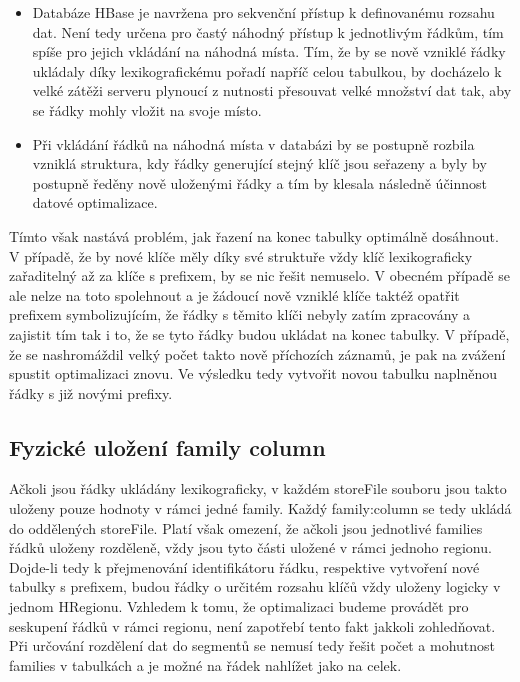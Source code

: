 \documentclass[thesis=M,czech]{FITthesis}[2012/06/26]
\begin{document}
\begin{itemize}
\item Databáze HBase je navržena pro sekvenční přístup k definovanému rozsahu dat. Není tedy určena pro častý náhodný přístup k jednotlivým řádkům, tím spíše pro jejich vkládání na náhodná místa. Tím, že by se nově vzniklé řádky ukládaly díky lexikografickému pořadí napříč celou tabulkou, by docházelo k velké zátěži serveru plynoucí z nutnosti přesouvat velké množství dat tak, aby se řádky mohly vložit na svoje místo.
 
\item Při vkládání řádků na náhodná místa v databázi by se postupně rozbila vzniklá struktura, kdy řádky generující stejný klíč jsou seřazeny a byly by postupně ředěny nově uloženými řádky a tím by klesala následně účinnost datové optimalizace. 
\end{itemize}

Tímto však nastává problém, jak řazení na konec tabulky optimálně dosáhnout. V případě, že by nové klíče měly díky své struktuře vždy klíč lexikograficky zařaditelný až za klíče s prefixem, by se nic řešit nemuselo. V obecném případě se ale nelze na toto spolehnout a je žádoucí nově vzniklé klíče taktéž opatřit prefixem symbolizujícím, že řádky s těmito klíči nebyly zatím zpracovány a zajistit tím tak i to, že se tyto řádky budou ukládat na konec tabulky. V případě, že se nashromáždil velký počet takto nově příchozích záznamů, je pak na zvážení spustit optimalizaci znovu. Ve výsledku tedy vytvořit novou tabulku naplněnou řádky s již novými prefixy. 

\subsection{Fyzické uložení family column}
Ačkoli jsou řádky ukládány lexikograficky, v každém storeFile souboru jsou takto uloženy pouze hodnoty v rámci jedné family. Každý family:column se tedy ukládá do oddělených storeFile. Platí však omezení, že ačkoli jsou jednotlivé families řádků uloženy rozděleně, vždy jsou tyto části uložené v rámci jednoho regionu. Dojde-li tedy k přejmenování identifikátoru řádku, respektive vytvoření nové tabulky s prefixem, budou řádky o určitém rozsahu klíčů vždy uloženy logicky v jednom HRegionu. Vzhledem k tomu, že optimalizaci budeme provádět pro seskupení řádků v rámci regionu, není zapotřebí tento fakt jakkoli zohledňovat. Při určování rozdělení dat do segmentů se nemusí tedy řešit počet a mohutnost families v tabulkách a je možné na řádek nahlížet jako na celek.
\end{document}
